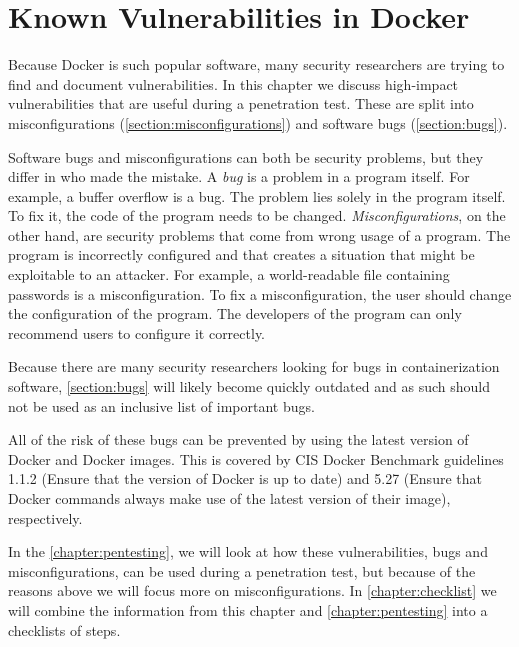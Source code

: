 \chapter{Known Vulnerabilities in Docker}\label{chapter:vulnerabilities}
Because Docker is such popular software, many security researchers are trying to find and document vulnerabilities. In this chapter we discuss high-impact vulnerabilities that are useful during a penetration test. These are split into misconfigurations (\autoref{section:misconfigurations}) and software bugs (\autoref{section:bugs}).

\medskip

Software bugs and misconfigurations can both be security problems, but they differ in who made the mistake. A \emph{bug} is a problem in a program itself. For example, a buffer overflow is a bug. The problem lies solely in the program itself. To fix it, the code of the program needs to be changed. \emph{Misconfigurations}, on the other hand, are security problems that come from wrong usage of a program. The program is incorrectly configured and that creates a situation that might be exploitable to an attacker. For example, a world-readable file containing passwords is a misconfiguration. To fix a misconfiguration, the user should change the configuration of the program. The developers of the program can only recommend users to configure it correctly.

\medskip

Because there are many security researchers looking for bugs in containerization software, \autoref{section:bugs} will likely become quickly outdated and as such should not be used as an inclusive list of important bugs.

All of the risk of these bugs can be prevented by using the latest version of Docker and Docker images. This is covered by CIS Docker Benchmark guidelines 1.1.2 (Ensure that the version of Docker is up to date) and 5.27 (Ensure that Docker commands always make use of the latest version of their image), respectively.

In the \autoref{chapter:pentesting}, we will look at how these vulnerabilities, bugs and misconfigurations, can be used during a penetration test, but because of the reasons above we will focus more on misconfigurations. In \autoref{chapter:checklist} we will combine the information from this chapter and \autoref{chapter:pentesting} into a checklists of steps.



